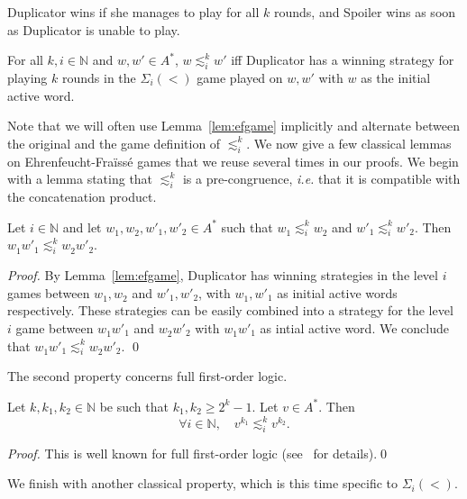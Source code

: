 \documentclass[envcountsame]{llncs}
\newcommand{\efgame}{Ehrenfeucht-Fra\"iss\'e\xspace}
\newcommand\nat{\ensuremath{\mathbb{N}}\xspace}
\newcommand{\siw}[1]{\ensuremath{\Sigma_{#1}(<)}\xspace}
\newcommand\sieq[2]{\ensuremath{\lesssim^{#1}_{#2}}\xspace}
\newcommand\ksieq[1]{\sieq{k}{#1}}
\newcommand\gmo{\ensuremath{\geqslant}\xspace}
\begin{document}
Duplicator wins if she manages to play for all $k$ rounds, and Spoiler
wins as soon as Duplicator is unable to play.

\begin{lemma}[Folklore] \label{lem:efgame}
  For all $k,i \in \nat$ and $w,w' \in A^{*}$, $w \ksieq{i} w'$ iff
  Duplicator has a winning strategy for playing $k$ rounds in the
  \siw{i} game played on $w,w'$ with $w$ as the initial active word.
\end{lemma}

Note that we will often use Lemma~\ref{lem:efgame} implicitly and
alternate between the original and the game definition of
$\ksieq{i}$. We now give a few classical lemmas on \efgame games that
we reuse several times in our proofs. We begin with a 
lemma stating that $\ksieq{i}$ is a pre-congruence, \emph{i.e.} that it is
compatible with the concatenation product.

\begin{lemma} \label{lem:efconcat}
  Let $i \in \nat$ and let $w^{}_1,w^{}_2,w'_1,w'_2 \in A^*$ such that $w^{}_1
  \ksieq{i} w^{}_2$ and $w'_1 \ksieq{i} w'_2$. Then $w^{}_1w'_1 \ksieq{i}
  w^{}_2w'_2$.
\end{lemma}

\begin{proof}
  By Lemma~\ref{lem:efgame}, Duplicator has winning strategies in the level
  $i$ games between $w^{}_1,w^{}_2$ and $w'_1,w'_2$, with $w^{}_1,w'_1$ as initial
  active words respectively. These strategies can be easily combined into a
  strategy for the level $i$ game between $w^{}_1w'_1$ and $w^{}_2w'_2$ with
  $w^{}_1w'_1$ as intial active word. We conclude that $w^{}_1w'_1 \ksieq{i}
  w^{}_2w'_2$. \qed
\end{proof}

The second property concerns full first-order logic.

\begin{lemma} \label{lem:aperiodic} Let $k,k_1,k_2 \in \nat$ be such that
  $k_1,k_2 \gmo 2^{k}-1$. Let $v \in A^*$. Then
  $$\forall i\in\nat,\quad v^{k_1} \ksieq{i} v^{k_2}.$$
\end{lemma}

\begin{proof}
  This is well known for full first-order logic
  (see~\cite{bookstraub} for details).\qed
\end{proof}

We finish with another classical property, which is this time specific
to \siw{i}.
\end{document}
